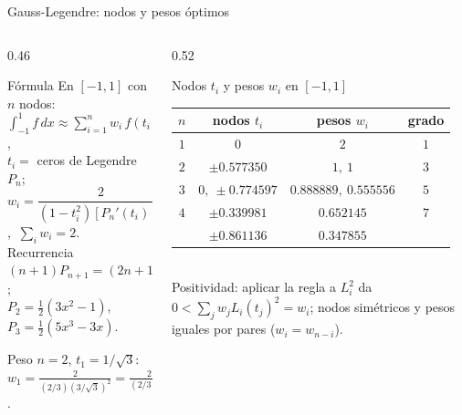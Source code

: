 \documentclass[aspectratio=169,10pt]{beamer}
\begin{document}
\begin{frame}{Gauss-Legendre: nodos y pesos óptimos}
\begin{columns}[T]
\begin{column}{0.46\textwidth}
\begin{cardidea}{Fórmula}{\faSuperscript}
{\footnotesize En $[-1,1]$ con $n$ nodos:\\[0.2mm]
$\displaystyle\int_{-1}^1 f\,dx\approx\sum_{i=1}^n w_i\,f(t_i)$,\\[0.6mm]
$t_i=$ ceros de Legendre $P_n$;\\[0.2mm]
$w_i=\dfrac{2}{(1-t_i^2)[P_n'(t_i)]^2}>0$, $\ \sum_i w_i=2$.\\[1.0mm]
Recurrencia $(n{+}1)P_{n+1}=(2n{+}1)xP_n-nP_{n-1}$;\\[0.2mm]
$P_2=\tfrac12(3x^2{-}1)$, $P_3=\tfrac12(5x^3{-}3x)$.}
\end{cardidea}
\vspace{1mm}
\begin{cardnota}[\faListOl]
{\footnotesize Peso $n{=}2$, $t_1{=}1/\sqrt3$: $w_1=\tfrac{2}{(2/3)(3/\sqrt3)^2}=\tfrac{2}{(2/3)\cdot3}=1$.}
\end{cardnota}
\end{column}
\begin{column}{0.52\textwidth}
\begin{cardgear}{Nodos $t_i$ y pesos $w_i$ en $[-1,1]$}{\faTable}
\centering
{\footnotesize\renewcommand{\arraystretch}{1.32}\setlength{\tabcolsep}{5pt}
\begin{tabular}{c|c|c|c}
$n$ & nodos $t_i$ & pesos $w_i$ & grado\\\hline
$1$ & $0$ & $2$ & $1$\\
$2$ & $\pm0.577350$ & $1,\ 1$ & $3$\\
$3$ & $0,\ \pm0.774597$ & $0.888889,\ 0.555556$ & $5$\\
$4$ & $\pm0.339981$ & $0.652145$ & $7$\\
   & $\pm0.861136$ & $0.347855$ & \\
\end{tabular}}\\[1.2mm]
{\footnotesize Positividad: aplicar la regla a $L_i^2$ da $0<\sum_j w_j L_i(t_j)^2=w_i$; nodos simétricos y pesos iguales por pares ($w_i=w_{n-i}$).}
\end{cardgear}
\end{column}
\end{columns}
\end{frame}
\end{document}
